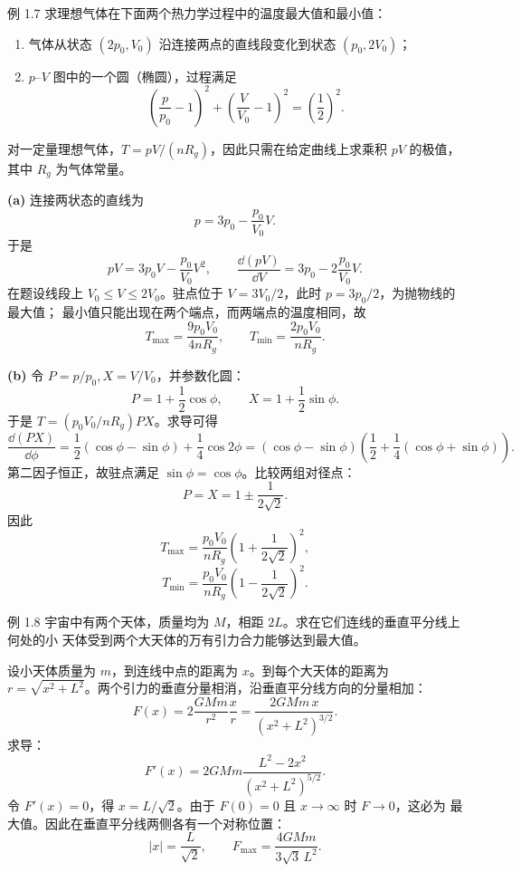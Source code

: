 \Needspace{0.40\textheight}
\begin{origexamplebox}{例 1.7}
求理想气体在下面两个热力学过程中的温度最大值和最小值：
\begin{enumerate}[label=(\alph*),leftmargin=2.2em]
 \item 气体从状态 $(2p_0,V_0)$ 沿连接两点的直线段变化到状态 $(p_0,2V_0)$；
 \item $p$--$V$ 图中的一个圆（椭圆），过程满足
 \[
  \left(\frac p{p_0}-1\right)^2+
  \left(\frac V{V_0}-1\right)^2=\left(\frac12\right)^2.
 \]
\end{enumerate}
\probdiagOneSeven
\end{origexamplebox}

\begin{xesolution}
对一定量理想气体，$T=pV/(nR_g)$，因此只需在给定曲线上求乘积 $pV$ 的极值，其中
$R_g$ 为气体常量。

\textbf{(a)} 连接两状态的直线为
\[
 p=3p_0-\frac{p_0}{V_0}V.
\]
于是
\[
 pV=3p_0V-\frac{p_0}{V_0}V^2,\qquad
 \frac{\dd(pV)}{\dd V}=3p_0-2\frac{p_0}{V_0}V.
\]
在题设线段上 $V_0\le V\le2V_0$。驻点位于 $V=3V_0/2$，此时 $p=3p_0/2$，为抛物线的最大值；
最小值只能出现在两个端点，而两端点的温度相同，故
\[
 \boxed{T_{\max}=\frac{9p_0V_0}{4nR_g}},\qquad
 \boxed{T_{\min}=\frac{2p_0V_0}{nR_g}}.
\]

\textbf{(b)} 令 $P=p/p_0, X=V/V_0$，并参数化圆：
\[
 P=1+\frac12\cos\phi,\qquad X=1+\frac12\sin\phi.
\]
于是 $T=(p_0V_0/nR_g)PX$。求导可得
\[
 \frac{\dd(PX)}{\dd\phi}
 =\frac12(\cos\phi-\sin\phi)+\frac14\cos2\phi
 =(\cos\phi-\sin\phi)
 \left(\frac12+\frac14(\cos\phi+\sin\phi)\right).
\]
第二因子恒正，故驻点满足 $\sin\phi=\cos\phi$。比较两组对径点：
\[
 P=X=1\pm\frac{1}{2\sqrt2}.
\]
因此
\[
 \boxed{T_{\max}=\frac{p_0V_0}{nR_g}
  \left(1+\frac1{2\sqrt2}\right)^2},
\]
\[
 \boxed{T_{\min}=\frac{p_0V_0}{nR_g}
  \left(1-\frac1{2\sqrt2}\right)^2}.
\]
\end{xesolution}

\Needspace{0.30\textheight}
\begin{origexamplebox}{例 1.8}
宇宙中有两个天体，质量均为 $M$，相距 $2L$。求在它们连线的垂直平分线上何处的小
天体受到两个大天体的万有引力合力能够达到最大值。
\probdiagOneEight
\end{origexamplebox}

\begin{xesolution}
设小天体质量为 $m$，到连线中点的距离为 $x$。到每个大天体的距离为
$r=\sqrt{x^2+L^2}$。两个引力的垂直分量相消，沿垂直平分线方向的分量相加：
\[
 F(x)=2\frac{GMm}{r^2}\frac{x}{r}
 =\frac{2GMm\,x}{(x^2+L^2)^{3/2}}.
\]
求导：
\[
 F'(x)=2GMm\frac{L^2-2x^2}{(x^2+L^2)^{5/2}}.
\]
令 $F'(x)=0$，得 $x=L/\sqrt2$。由于 $F(0)=0$ 且 $x\to\infty$ 时 $F\to0$，这必为
最大值。因此在垂直平分线两侧各有一个对称位置：
\[
 \boxed{|x|=\frac{L}{\sqrt2}},
 \qquad
 \boxed{F_{\max}=\frac{4GMm}{3\sqrt3\,L^2}}.
\]
\end{xesolution}

